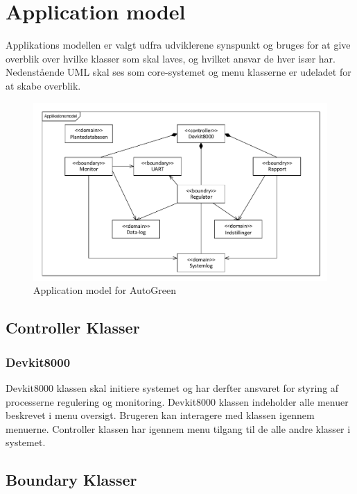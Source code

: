 \section{Application model}

Applikations modellen er valgt udfra udviklerene synspunkt og bruges for at give overblik over hvilke klasser som skal laves, og hvilket ansvar de hver især har. Nedenstående UML skal ses som core-systemet  og menu klasserne er udeladet for at skabe overblik. 

\begin{figure}[!h]
\centering 
\includegraphics[scale=0.8] {../fig/UML_autogreen.pdf}
\caption{Application model for AutoGreen}
\label{fig:UML}
\end{figure}

\subsection{Controller Klasser}

\subsubsection{Devkit8000}

Devkit8000 klassen skal initiere systemet og har derfter ansvaret for styring af processerne regulering og monitoring.
Devkit8000 klassen indeholder alle menuer beskrevet i menu oversigt. Brugeren kan interagere med klassen igennem menuerne.
Controller klassen har igennem menu tilgang til de alle andre klasser i systemet.


\subsection{Boundary Klasser}

